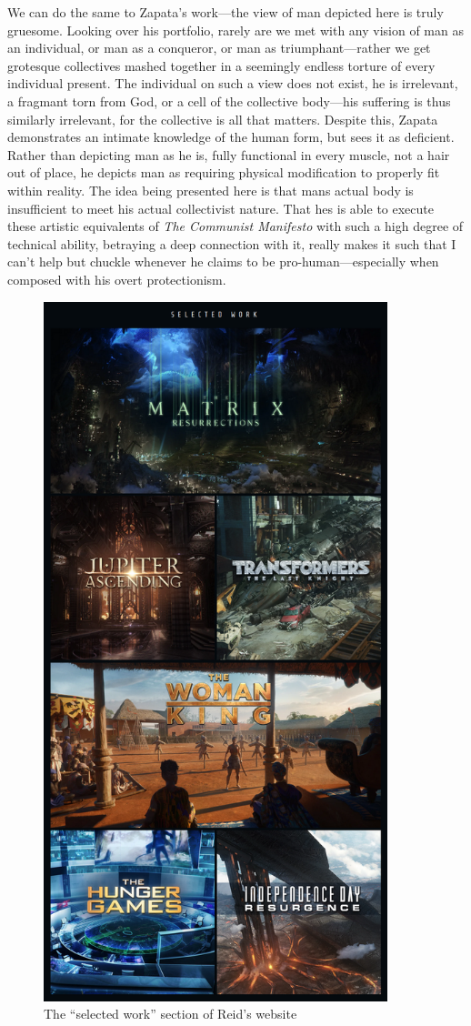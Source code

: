 \documentclass[11pt]{article}
\begin{document}
We can do the same to Zapata's work---the view of man depicted here is truly gruesome. Looking over his portfolio, rarely are we met with any vision of man as an individual, or man as a conqueror, or man as triumphant---rather we get grotesque collectives mashed together in a seemingly endless torture of every individual present. The individual on such a view does not exist, he is irrelevant, a fragmant torn from God, or a cell of the collective body---his suffering is thus similarly irrelevant, for the collective is all that matters. Despite this, Zapata demonstrates an intimate knowledge of the human form, but sees it as deficient. Rather than depicting man as he is, fully functional in every muscle, not a hair out of place, he depicts man as requiring physical modification to properly fit within reality. The idea being presented here is that mans actual body is insufficient to meet his actual collectivist nature. That hes is able to execute these artistic equivalents of \emph{The Communist Manifesto} with such a high degree of technical ability, betraying a deep connection with it, really makes it such that I can't help but chuckle whenever he claims to be pro-human---especially when composed with his overt protectionism.

\begin{figure}[htbp]
\centering
\includegraphics[width=10cm]{./images/Reid Southen slop-monger.png}
\caption{The ``selected work'' section of Reid's website}
\end{figure}
\end{document}
